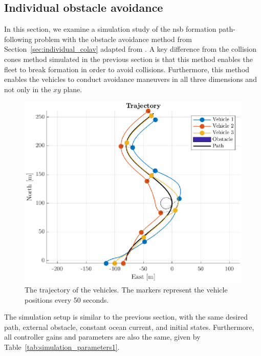 

\subsection{Individual obstacle avoidance}\label{sec:individual_obstacle}
In this section, we examine a simulation study of the \gls{nsb} formation path-following problem with the obstacle avoidance method from Section~\ref{sec:individual_colav} adapted from \cite{arrichiello_formation_2006}. A key difference from the collision cones method simulated in the previous section is that this method enables the fleet to break formation in order to avoid collisions. Furthermore, this method enables the vehicles to conduct avoidance maneuvers in all three dimensions and not only in the $xy$ plane.\enlargethispage*{\baselineskip}

\begin{figure}[htb]
    \centering
    \includegraphics[width=.8\textwidth]{figures/plot3d_IC.eps}
    \vspace*{-4mm}
    \caption{The trajectory of the vehicles. The markers represent the vehicle positions every 50 seconds.}
    \label{fig:plot3d-IC}
    \vspace{-2mm}
\end{figure}

The simulation setup is similar to the previous section, with the same desired path, external obstacle, constant ocean current, and initial states. Furthermore, all controller gains and parameters are also the same, given by Table~\ref{tab:simulation_parameters1}.

